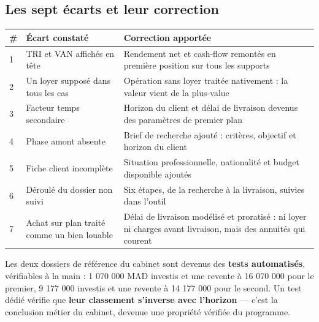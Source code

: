 \documentclass[11pt,a4paper]{article}
\begin{document}
\subsection{Les sept écarts et leur correction}

\begin{table}[H]
	\centering
	\small
	\renewcommand{\arraystretch}{1.40}
	\begin{tabular}{|>{\centering\arraybackslash}p{0.7cm}|>{\raggedright\arraybackslash}p{6.6cm}|>{\raggedright\arraybackslash}p{7.4cm}|}
		\hline
		\rowcolor{eccblue!15}
		\textbf{\color{eccblue}\#} & \textbf{\color{eccblue}Écart constaté} & \textbf{\color{eccblue}Correction apportée} \\
		\hline
		\rowcolor{white}
		1 & TRI et VAN affichés en tête & Rendement net et cash-flow remontés en première position sur tous les supports \\
		\hline
		\rowcolor{gray!8}
		2 & Un loyer supposé dans tous les cas & Opération sans loyer traitée nativement : la valeur vient de la plus-value \\
		\hline
		\rowcolor{white}
		3 & Facteur temps secondaire & Horizon du client et délai de livraison devenus des paramètres de premier plan \\
		\hline
		\rowcolor{gray!8}
		4 & Phase amont absente & Brief de recherche ajouté : critères, objectif et horizon du client \\
		\hline
		\rowcolor{white}
		5 & Fiche client incomplète & Situation professionnelle, nationalité et budget disponible ajoutés \\
		\hline
		\rowcolor{gray!8}
		6 & Déroulé du dossier non suivi & Six étapes, de la recherche à la livraison, suivies dans l'outil \\
		\hline
		\rowcolor{white}
		7 & Achat sur plan traité comme un bien louable & Délai de livraison modélisé et proratisé : ni loyer ni charges avant livraison, mais des annuités qui courent \\
		\hline
	\end{tabular}
\end{table}

Les deux dossiers de référence du cabinet sont devenus des \textbf{tests automatisés}, vérifiables à la main : 1 070 000 MAD investis et une revente à 16 070 000 pour le premier, 9 177 000 investis et une revente à 14 177 000 pour le second. Un test dédié vérifie que \textbf{leur classement s'inverse avec l'horizon} — c'est la conclusion métier du cabinet, devenue une propriété vérifiée du programme.
\end{document}

